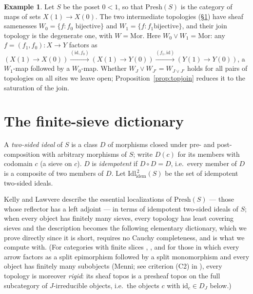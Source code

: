 \documentclass[11pt]{amsart}
\theoremstyle{definition}
\newtheorem{ex}[thm]{Example}
\newcommand{\Mor}{\mathrm{Mor}}
\newcommand{\Presh}{\mathrm{Presh}}
\newcommand{\Idem}{\mathrm{Idl}^{\,2}_{\mathrm{idem}}}
\begin{document}
\begin{ex}\label{ex:twochain}
Let $S$ be the poset $0<1$, so that $\Presh(S)$ is the category of maps of
sets $X(1)\to X(0)$. The two intermediate topologies (\S\ref{sec:ideal}) have
sheaf samenesses $W_0=\{f:f_0\text{ bijective}\}$ and $W_1=\{f:f_1\text{
bijective}\}$, and their join topology is the degenerate one, with
$W=\Mor$. Here $W_0\vee W_1=\Mor$: any $f=(f_1,f_0)\colon X\to Y$ factors as
$(X(1)\to X(0))\xrightarrow{(\mathrm{id},f_0)}(X(1)\to Y(0))
\xrightarrow{(f_1,\mathrm{id})}(Y(1)\to Y(0))$, a $W_1$-map followed by a
$W_0$-map. Whether $W_J\vee W_{J'}=W_{J\vee J'}$ holds for all pairs of
topologies on all sites we leave open; Proposition~\ref{prop:topjoin} reduces
it to the saturation of the join.
\end{ex}

\section{The finite-sieve dictionary}\label{sec:ideal}

A \emph{two-sided ideal} of $S$ is a class $D$ of morphisms closed under pre-
and post-composition with arbitrary morphisms of $S$; write $D(c)$ for its
members with codomain $c$ (a sieve on $c$). $D$ is \emph{idempotent} if
$D\circ D=D$, i.e.\ every member of $D$ is a composite of two members of $D$.
Let $\Idem(S)$ be the set of idempotent two-sided ideals.

Kelly and Lawvere \cite{KL89} describe the essential localizations of
$\Presh(S)$ --- those whose reflector has a left adjoint --- in terms of
idempotent two-sided ideals of $S$; when every object has finitely many
sieves, every topology has least covering sieves and the description becomes
the following elementary dictionary, which we prove directly since it is
short, requires no Cauchy completeness, and is what we compute with. (For
categories with finite slices \cite[C2.2.21]{Elephant}, \cite[Prop.~4.10]{KL89},
and for those in which every arrow factors as a split epimorphism followed by
a split monomorphism and every object has finitely many subobjects (Menni;
see criterion (C2) in \cite{Marques25}), every topology is moreover
\emph{rigid}: its sheaf topos is a presheaf topos on the full subcategory
of $J$-irreducible objects, i.e.\ the objects $c$ with $\mathrm{id}_c\in D_J$
below.)
\end{document}
